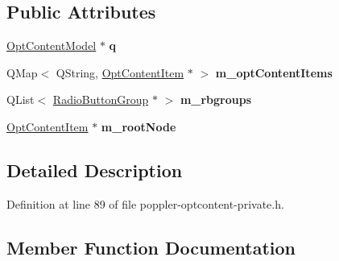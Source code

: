 \subsection*{Public Attributes}
\begin{DoxyCompactItemize}
\item 
\mbox{\label{class_poppler_1_1_opt_content_model_private_a0dd8f651e8ea50254f7fa6df92888e1f}} 
\hyperlink{class_poppler_1_1_opt_content_model}{Opt\+Content\+Model} $\ast$ {\bfseries q}
\item 
\mbox{\label{class_poppler_1_1_opt_content_model_private_a32afdb68e566ab7758f24dd995e2e737}} 
Q\+Map$<$ Q\+String, \hyperlink{class_poppler_1_1_opt_content_item}{Opt\+Content\+Item} $\ast$ $>$ {\bfseries m\+\_\+opt\+Content\+Items}
\item 
\mbox{\label{class_poppler_1_1_opt_content_model_private_a26774910ada46f5bdc6b889915536b57}} 
Q\+List$<$ \hyperlink{class_poppler_1_1_radio_button_group}{Radio\+Button\+Group} $\ast$ $>$ {\bfseries m\+\_\+rbgroups}
\item 
\mbox{\label{class_poppler_1_1_opt_content_model_private_a11f81bf254d257b847703a0f8a4bf5a1}} 
\hyperlink{class_poppler_1_1_opt_content_item}{Opt\+Content\+Item} $\ast$ {\bfseries m\+\_\+root\+Node}
\end{DoxyCompactItemize}


\subsection{Detailed Description}


Definition at line 89 of file poppler-\/optcontent-\/private.\+h.



\subsection{Member Function Documentation}
\mbox{\label{class_poppler_1_1_opt_content_model_private_a4f7f8ce316e9141b44363a2f3e64fa9a}} 
